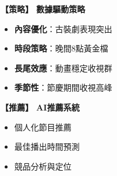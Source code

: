 \documentclass[10pt]{beamer}
\begin{document}
\begin{frame}
\begin{columns}[T]
\begin{column}{0.4\textwidth}
\vspace{0.2cm}
\textbf{【策略】 數據驅動策略}
\begin{itemize}
    \item \textbf{內容優化}：古裝劇表現突出
    \item \textbf{時段策略}：晚間8點黃金檔
    \item \textbf{長尾效應}：動畫穩定收視群
    \item \textbf{季節性}：節慶期間收視高峰
\end{itemize}

\vspace{0.2cm}
\textbf{【推薦】 AI推薦系統}
\begin{itemize}
    \item 個人化節目推薦
    \item 最佳播出時間預測
    \item 競品分析與定位
\end{itemize}
\end{column}
\end{columns}

\end{frame}
\end{document}
